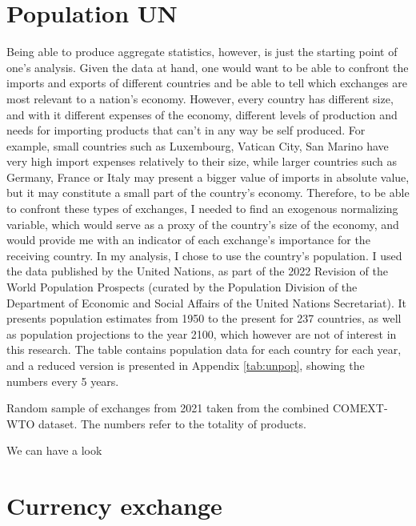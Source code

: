 \section{Population UN}
Being able to produce aggregate statistics, however, is just the starting point of one's analysis. Given the data at hand, one would want to be able to confront the imports and exports of different countries and be able to tell which exchanges are most relevant to a nation's economy. However, every country has different size, and with it different expenses of the economy, different levels of production and needs for importing products that can't in any way be self produced. For example, small countries such as Luxembourg, Vatican City, San Marino have very high import expenses relatively to their size, while larger countries such as Germany, France or Italy may present a bigger value of imports in absolute value, but it may constitute a small part of the country's economy.
Therefore, to be able to confront these types of exchanges, I needed to find an exogenous normalizing variable, which would serve as a proxy of the country's size of the economy, and would provide me with an indicator of each exchange's importance for the receiving country. 
In my analysis, I chose to use the country's population. I used the data published by the United Nations, as part of the 2022 Revision of the World Population Prospects \cite{un2022population} (curated by the Population Division of the Department of Economic and Social Affairs of the United Nations Secretariat). It presents population estimates from 1950 to the present for 237 countries, as well as population projections to the year 2100, which however are not of interest in this research. The table contains population data for each country for each year, and a reduced version is presented in Appendix \ref{tab:unpop}, showing the numbers every 5 years.


\begin{table}
    \centering
    
    \caption{Random sample of exchanges from 2021 taken from the combined COMEXT-WTO dataset. The numbers refer to the totality of products.}
    \label{tab:normexample}
\end{table}

We can have a look


\section{Currency exchange}